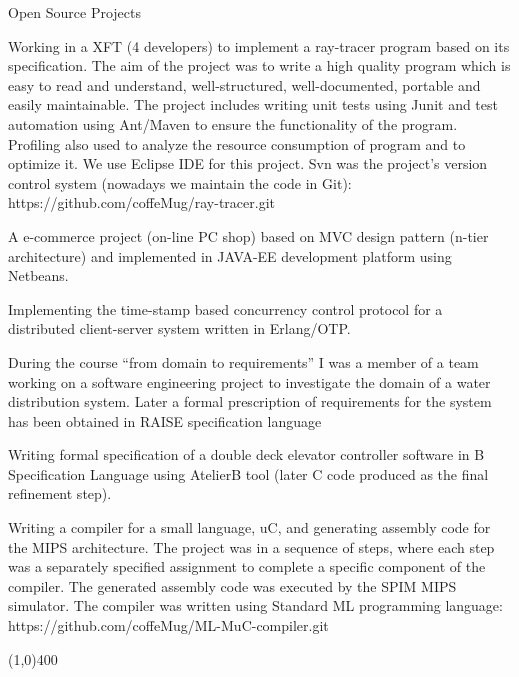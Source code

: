 \documentclass{resume}
\begin{document}
\begin{category}{Open Source Projects}

\citembullet
Working in a XFT (4 developers) to implement a ray-tracer program based on its specification.
The aim of the project was to write a high quality program which is easy to read and understand, 
well-structured, well-documented, portable and easily maintainable.   
The project includes writing unit tests using Junit and test automation using Ant/Maven to ensure the functionality of the program.
Profiling also used to analyze the resource consumption of program and to optimize it. 
We use Eclipse IDE for this project.
Svn was the project's version control system (nowadays we maintain the code in Git):
https://github.com/coffeMug/ray-tracer.git

\citembullet A e-commerce project (on-line PC shop) based on MVC design pattern (n-tier architecture) and 
implemented in JAVA-EE development platform using Netbeans.

\citembullet
Implementing the time-stamp based concurrency control protocol for a distributed client-server system written in
Erlang/OTP.

\citembullet
During the course ``from domain to requirements'' I was a member of a team working on a software engineering
project to investigate the domain of a water distribution system. Later a formal prescription of 
requirements for the system has been obtained in RAISE specification language

\citembullet
Writing formal specification of a double deck elevator controller software in B Specification Language using
AtelierB tool (later C code produced as the final refinement step).

\citembullet Writing a compiler for a small language, uC, and generating assembly 
code for the MIPS architecture.
The project was in a sequence of steps, where each step was a separately specified 
assignment to complete a specific component of the compiler.
The generated assembly code was executed by the SPIM MIPS simulator. 
The compiler was written using Standard ML programming language:
https://github.com/coffeMug/ML-MuC-compiler.git 

\end{category}

\begin{center}
\line(1,0){400}
\end{center}

\end{document}
